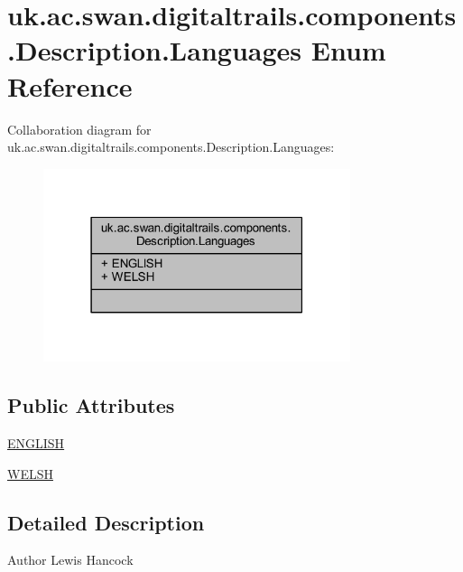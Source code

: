 \hypertarget{enumuk_1_1ac_1_1swan_1_1digitaltrails_1_1components_1_1_description_1_1_languages}{\section{uk.\+ac.\+swan.\+digitaltrails.\+components.\+Description.\+Languages Enum Reference}
\label{enumuk_1_1ac_1_1swan_1_1digitaltrails_1_1components_1_1_description_1_1_languages}
}


Collaboration diagram for uk.\+ac.\+swan.\+digitaltrails.\+components.\+Description.\+Languages\+:
\nopagebreak
\begin{figure}[H]
\begin{center}
\leavevmode
\includegraphics[width=255pt]{enumuk_1_1ac_1_1swan_1_1digitaltrails_1_1components_1_1_description_1_1_languages__coll__graph}
\end{center}
\end{figure}
\subsection*{Public Attributes}
\begin{DoxyCompactItemize}
\item 
\hyperlink{enumuk_1_1ac_1_1swan_1_1digitaltrails_1_1components_1_1_description_1_1_languages_ae7a7797632b7148d9432d216e1ae8273}{E\+N\+G\+L\+I\+S\+H}
\item 
\hyperlink{enumuk_1_1ac_1_1swan_1_1digitaltrails_1_1components_1_1_description_1_1_languages_a9025caaf5ee7dae0600bc60c953beea9}{W\+E\+L\+S\+H}
\end{DoxyCompactItemize}


\subsection{Detailed Description}
\begin{DoxyAuthor}{Author}
Lewis Hancock 
\end{DoxyAuthor}


